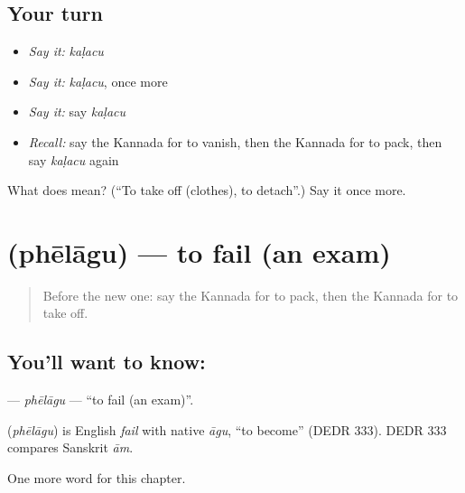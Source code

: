 \subsection*{Your turn}
\begin{itemize}
\raggedright
  \item \emph{Say it:} \emph{kaḷacu}
  \item \emph{Say it:} \emph{kaḷacu}, once more
  \item \emph{Say it:} say \emph{kaḷacu}
  \item \emph{Recall:} say the Kannada for to vanish, then the Kannada for to pack, then say \emph{kaḷacu} again
\end{itemize}

\begin{tcolorbox}[breakable,colback=teal!4,colframe=teal!35!black,title={Before you move on}]
What does  mean? (\textquotedblleft{}To take off (clothes), to detach\textquotedblright{}.) Say it once more.
\end{tcolorbox}
\section[\texorpdfstring{\kn{ಫೇಲಾಗು} (phēlāgu)}{ಫೇಲಾಗು (phēlāgu)}]{ (phēlāgu) — to fail (an exam)}

\label{lesson:KA-C281-phelagu}



\begin{quote}
Before the new one: say the Kannada for to pack, then the Kannada for to take off.
\end{quote}

\subsection*{You'll want to know: }
\textbf{} — \emph{phēlāgu} — \textquotedblleft{}to fail (an exam)\textquotedblright{}.

\begin{cousinweb}
\textbf{} (\emph{phēlāgu}) is English \emph{fail} with native \emph{āgu}, \textquotedblleft{}to become\textquotedblright{} (DEDR 333). DEDR 333 compares Sanskrit \emph{ām}.
\end{cousinweb}

\begin{grammarlens}[title={What you've built}]
One more word for this chapter.
\end{grammarlens}

